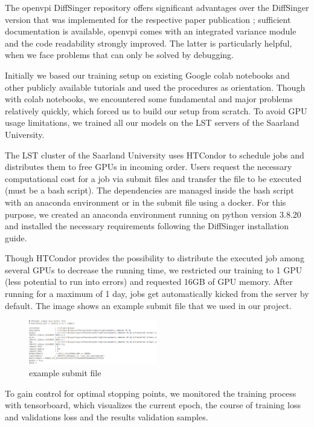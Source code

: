 \documentclass[a4paper]{article}
\begin{document}
	The openvpi DiffSinger repository \cite{openvpi-diffsinger} offers significant advantages over the DiffSinger version that was implemented for the respective paper publication \cite{moon-diffsinger}; sufficient documentation is available, openvpi comes with an integrated variance module and the code readability strongly improved. The latter is particularly helpful, when we face problems that can only be solved by debugging.
	
	Initially we based our training setup on existing Google colab notebooks and other publicly available tutorials and used the procedures as orientation. Though  with colab notebooks, we encountered some fundamental and major problems relatively quickly, which forced us to build our setup from scratch. To avoid GPU usage limitations, we trained all our models on the LST servers of the Saarland University. \cite{lst-wiki}
	
	The LST cluster of the Saarland University uses HTCondor to schedule jobs and distributes them to free GPUs in incoming order. Users request the necessary computational cost for a job via submit files and transfer the file to be executed (must be a bash script). The dependencies are managed inside the bash script with an anaconda environment or in the submit file using a docker. For this purpose, we created an anaconda environment running on python version 3.8.20 and installed the necessary requirements following the DiffSinger installation guide. \cite{openvpi-diffsinger}
	
	Though HTCondor provides the possibility to distribute the executed job among several GPUs to decrease the running time, we restricted our training to 1 GPU (less potential to run into errors) and requested 16GB of GPU memory. After running for a maximum of 1 day, jobs get automatically kicked from the server by default. The image shows an example submit file that we used in our project.
	
	\begin{figure}[htbp]
		\centering
		\includegraphics[width=0.5\textwidth]{graphics/submit_file.png}
		\caption{example submit file}
		\label{fig:submit_file}
	\end{figure}
	
	To gain control for optimal stopping points, we monitored the training process with tensorboard, which visualizes the current epoch, the course of training loss and validations loss and the results validation samples.
	
\end{document}
